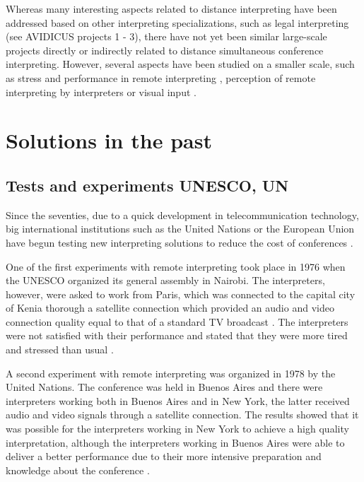 \documentclass[output=paper]{langsci/langscibook}
\begin{document}
Whereas many interesting aspects related to distance interpreting have been addressed based on other interpreting specializations, such as legal interpreting (see AVIDICUS projects 1 - 3), there have not yet been similar large-scale projects directly or indirectly related to distance simultaneous conference interpreting. However, several aspects have been studied on a smaller scale, such as stress and performance in remote interpreting \citep{Moser-Mercer2003,Roziner2010}, perception of remote interpreting by interpreters \citep{Mouzourakis2006} or visual input \citep{Rennert2008,Luisetto2016}.

\section{Solutions in the past}
\label{sec:ziegler:03}
\subsection{Tests and experiments \textsc{UN}ESCO, \textsc{UN}}
\label{sub:ziegler:3.1}
Since the seventies, due to a quick development in telecommunication technology, big international institutions such as the United Nations or the European Union have begun testing new interpreting solutions to reduce the cost of conferences \citep[26]{UNESCO1987}.

One of the first experiments with remote interpreting took place in 1976 when the \textsc{UN}ESCO organized its general assembly in Nairobi. The interpreters, however, were asked to work from Paris, which was connected to the capital city of Kenia thorough a satellite connection which provided an audio and video connection quality equal to that of a standard TV broadcast \citep[30]{Mouzourakis1996}. The interpreters were not satisfied with their performance and stated that they were more tired and stressed than usual \citep[294]{Kurz2000}.

A second experiment with remote interpreting was organized in 1978 by the United Nations. The conference was held in Buenos Aires and there were interpreters working both in Buenos Aires and in New York, the latter received audio and video signals through a satellite connection. The results showed that it was possible for the interpreters working in New York to achieve a high quality interpretation, \citep[26]{UNESCO1987} although the interpreters working in Buenos Aires were able to deliver a better performance due to their more intensive preparation and knowledge about the conference \citep[82-90]{Chernov2004}. 
\end{document}
